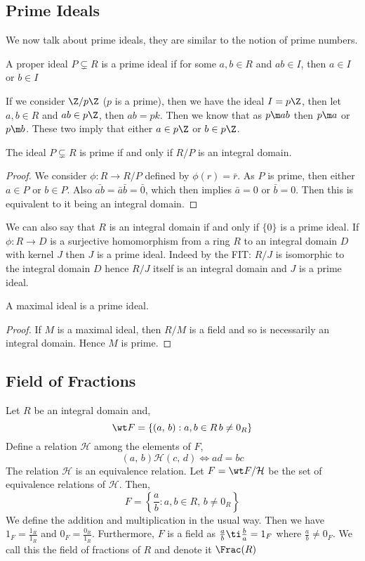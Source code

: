 
\subsection{Prime Ideals}
We now talk about prime ideals, they are similar to the notion of prime numbers.
\begin{ndefi}
  A proper ideal $P \subsetneq R$ is a prime ideal if for some $a, b \in R$ and $ab \in I$, then $a \in I$ or $b \in I$
\end{ndefi}

\noindent
If we consider $\Z/p\Z$ ($p$ is a prime), then we have the ideal $I = p\Z$, then let $a, b \in R$ and $ab \in p\Z$, then $ab = pk$. Then we know that as $p \m ab$ then $p \m a$ or $p \m b$. These two imply that either $a \in p\Z$ or $b \in p\Z$.

\begin{nthm}
  The ideal $P \subsetneq R$ is prime if and only if $R/P$ is an integral domain.
\end{nthm}
\begin{proof}
  We consider $\phi : R \to R/P$ defined by $\phi(r) = \bar r$. As $P$ is prime, then either $a \in P$ or $b \in P$. Also $\bar{ab} = \bar a \bar b = \bar 0$, which then implies $\bar a = 0$ or $\bar b = 0$. Then this is equivalent to it being an integral domain.
\end{proof}

We can also say that $R$ is an integral domain if and only if $\{0\}$ is a prime ideal. If $\phi : R \to D$ is a surjective homomorphism from a ring $R$ to an integral domain $D$ with kernel $J$ then $J$ is a prime ideal. Indeed by the FIT: $R/J$ is isomorphic to the integral domain $D$ hence $R/J$ itself is an integral domain and $J$ is a prime ideal.

\begin{nprop}
  A maximal ideal is a prime ideal.
\end{nprop}
\begin{proof}
  If $M$ is a maximal ideal, then $R/M$ is a field and so is necessarily an integral domain. Hence $M$ is prime.
\end{proof}

\subsection{Field of Fractions}
Let $R$ be an integral domain and,
$$ \wt F = \{(a,\,b) : a, b \in R\, b \ne 0_R\} $$
Define a relation $\mathcal{H}$ among the elements of $F$,
$$ (a,\,b)\mathcal{H}(c,\,d) \iff ad = bc $$
The relation $\mathcal{H}$ is an equivalence relation. Let $F = \wt F/\mathcal{H}$ be the set of equivalence relations of $\mathcal{H}$. Then,
$$ F = \left\{ \frac{a}{b} : a, b \in R,\, b\ne 0_R \right\} $$
We define the addition and multiplication in the usual way. Then we have $1_F = \frac{1_R}{1_R}$ and $0_F = \frac{0_R}{1_R}$. Furthermore, $F$ is a field as $\frac{a}{b} \ti \frac{b}{a} = 1_F$ where $\frac{a}{b} \ne 0_F$. We call this the field of fractions of $R$ and denote it $\Frac(R)$

